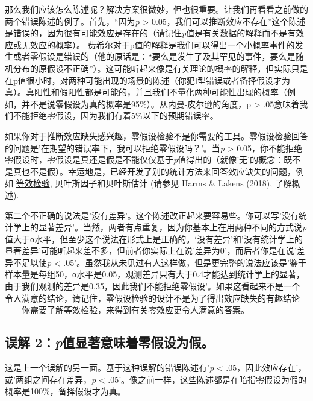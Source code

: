 \documentclass[
  letterpaper,
  DIV=11,
  numbers=noendperiod]{scrreprt}
\begin{document}
那么我们应该怎么陈述呢？解决方案很微妙，但也很重要。让我们再看看之前做的两个错误陈述的例子。首先，``因为\emph{p}
\textgreater{}
0.05，我们可以推断效应不存在''这个陈述是错误的，因为很有可能效应是存在的（请记住\emph{p}值是有关数据的解释而不是有效应或无效应的概率）。
费希尔对于p值的解释是我们可以得出一个小概率事件的发生或者零假设是错误的（他的原话是：``要么是发生了及其罕见的事件，要么是随机分布的原假设不正确''）。这可能听起来像是有关理论的概率的解释，但实际只是在p值很小时，对两种可能出现的场景的陈述（你犯Ⅰ型错误或者备择假设才为真）。真阳性和假阳性都是可能的，并且我们不量化两种可能性出现的概率（例如，并不是说零假设为真的概率是95\%）。从内曼-皮尔逊的角度，p
\textgreater{}
.05意味着我们不能拒绝零假设，因为我们有着5\%以下的预期错误率。

如果你对于推断效应缺失感兴趣，零假设检验不是你需要的工具。零假设检验回答的问题是'在期望的错误率下，我可以拒绝零假设吗？'。当\emph{p}
\textgreater{}
0.05，你不能拒绝零假设时，零假设是真还是假是不能仅仅基于\emph{p}值得出的（就像'无'的概念：既不是真也不是假）。幸运地是，已经开发了别的统计方法来回答效应缺失的问题，例如
\protect\hyperlink{equivalencetest}{等效检验}, 贝叶斯因子和贝叶斯估计
(请参见 Harms \& Lakens (2018), 了解概述).

第二个不正确的说法是'没有差异'。这个陈述改正起来要容易些。你可以写'没有统计学上的显著差异'。当然，两者有点重复，因为你基本上在用两种不同的方式说\emph{p}值大于α水平，但至少这个说法在形式上是正确的。`没有差异'和'没有统计学上的显著差异'可能听起来差不多，但前者你实际上在说'差异为0'，而后者你是在说'差异不足以使\emph{p}
\textless{}
.05'。虽然我从未见过有人这样做，但是更完整的说法应该是'鉴于样本量是每组50，α水平是0.05，观测差异只有大于0.4才能达到统计学上的显著，由于我们观测的差异是0.35，因此我们不能拒绝零假设'。如果这看起来不是一个令人满意的结论，请记住，零假设检验的设计不是为了得出效应缺失的有趣结论------你需要了解等效检验，来得到有关零效应更令人满意的答案。

\hypertarget{ux8befux89e3-2pux503cux663eux8457ux610fux5473ux7740ux96f6ux5047ux8bbeux4e3aux5047}{%
\subsection{\texorpdfstring{误解
2：\emph{p}值显著意味着零假设为假。}{误解 2：p值显著意味着零假设为假。}}\label{ux8befux89e3-2pux503cux663eux8457ux610fux5473ux7740ux96f6ux5047ux8bbeux4e3aux5047}}

这是上一个误解的另一面。基于这种误解的错误陈述有'\emph{p} \textless{}
.05，因此效应存在'，或'两组之间存在差异，\emph{p} \textless{}
.05'。像之前一样，这些陈述都是在暗指零假设为假的概率是100\%，备择假设才为真。
\end{document}
